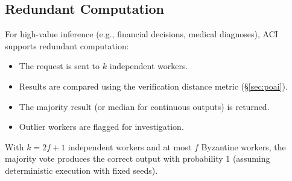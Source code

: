 \subsection{Redundant Computation}

For high-value inference (e.g., financial decisions, medical diagnoses), ACI
supports redundant computation:
\begin{itemize}[leftmargin=1.1em]
    \item The request is sent to $k$ independent workers.
    \item Results are compared using the verification distance metric
    (\S\ref{sec:poai}).
    \item The majority result (or median for continuous outputs) is returned.
    \item Outlier workers are flagged for investigation.
\end{itemize}

\begin{proposition}
With $k = 2f + 1$ independent workers and at most $f$ Byzantine workers, the
majority vote produces the correct output with probability 1 (assuming
deterministic execution with fixed seeds).
\end{proposition}

